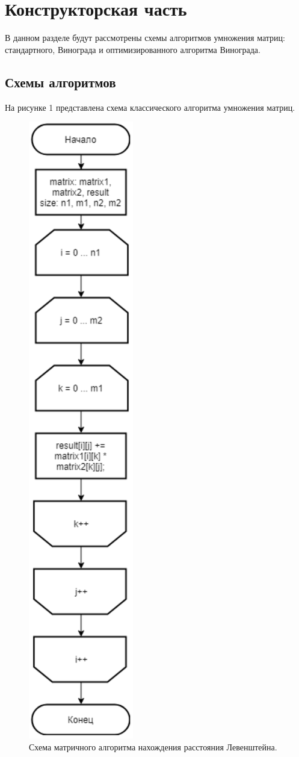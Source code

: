 \documentclass[a4paper,12pt]{article}
\begin{document}
	\newpage
	\section{Конструкторская часть}
	\hfill
	В данном разделе будут рассмотрены схемы алгоритмов умножения матриц: стандартного, Винограда и оптимизированного алгоритма Винограда.
	\subsection{Схемы алгоритмов}
	\hfill
	
	На рисунке 1 представлена схема классического алгоритма умножения
	матриц.
	\begin{figure}[H]
		\centering
		\includegraphics{classic.png}
		\captionsetup{justification=centering}
		\caption{Схема матричного алгоритма нахождения расстояния Левенштейна.}
		\label{Рис 1}
	\end{figure}
\end{document}
